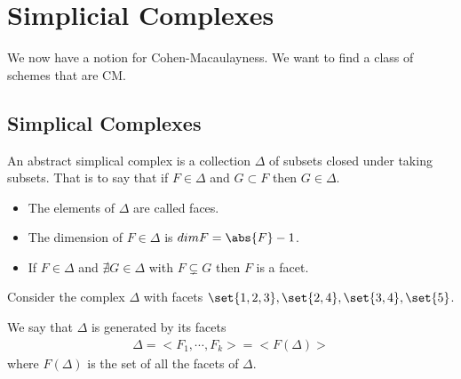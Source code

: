 \newpage
\section{Simplicial Complexes}

We now have a notion for Cohen-Macaulayness. We want to find a class of schemes that are CM.

\subsection{Simplical Complexes}

\begin{definition}
    An abstract simplical complex is a collection $\Delta $ of subsets closed under taking subsets. That is to say that if $F \in \Delta$ and $G \subset F$ then $G \in \Delta$.
    \begin{itemize}
        \item The elements of $\Delta$ are called faces.
        \item The dimension of $F \in \Delta$ is $dim F = \abs{F} - 1$.
        \item If $F \in \Delta$ and $\nexists G \in \Delta $ with $F \subsetneq G $ then $F$ is a facet.
    \end{itemize}
\end{definition}

\begin{example}
    Consider the complex $\Delta$ with facets $\set{1,2,3}, \set{2,4}, \set{3,4} , \set{5}$.

    \begin{center}
    \end{center}
\end{example}

\begin{definition}
    We say that $\Delta$ is generated by its facets
    \begin{align*}
        \Delta = < F_1 , \cdots , F_k  > = < F(\Delta) >
    \end{align*}
    where $F(\Delta) $ is the set of all the facets of $\Delta$.
\end{definition}

